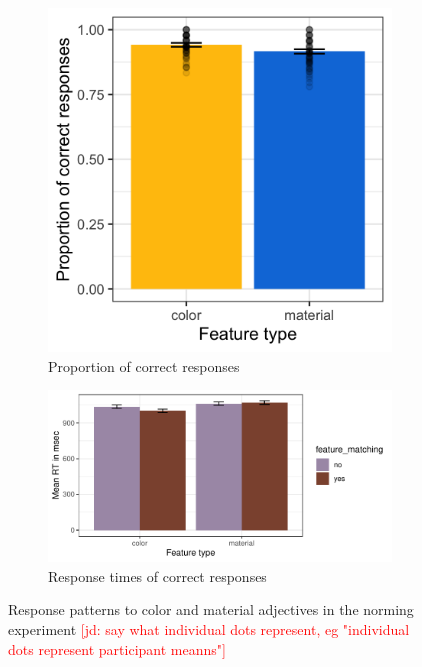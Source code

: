 \documentclass[12pt,letterpaper]{article}
\newcommand{\jd}[1]{\textcolor{Red}{[jd: #1]}}
\begin{document}
\begin{figure}[ht]
\centering
\begin{subfigure}{.4\textwidth}
\centering
\includegraphics[width=\textwidth]{plots/exp1_proportion.png}
\caption{Proportion of correct responses}
\label{fig:exp1_a}
\end{subfigure} \hspace{9mm}
\begin{subfigure}{.4 \textwidth}
\centering
\includegraphics[width=\textwidth]{plots/exp1_rt.png}
\caption{Response times of correct responses}
\label{fig:exp1_b}
\end{subfigure}
\caption{Response patterns to color and material adjectives in the norming experiment \jd{say what individual dots represent, eg "individual dots represent participant meanns"}}
\label{fig:exp1}
\end{figure}   
\end{document}
